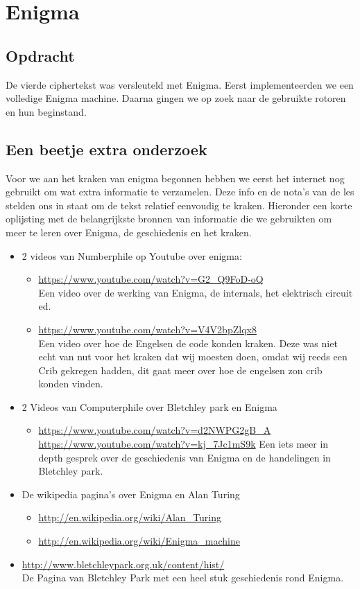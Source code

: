 
\section{Enigma}
\subsection{Opdracht}
De vierde ciphertekst was versleuteld met Enigma. Eerst implementeerden we een volledige Enigma machine. Daarna gingen we op zoek naar de gebruikte rotoren en hun beginstand. 

\subsection{Een beetje extra onderzoek}
Voor we aan het kraken van enigma begonnen hebben we eerst het internet nog gebruikt om wat extra informatie te verzamelen. Deze info en de nota's van de les stelden ons in staat om de tekst relatief eenvoudig te kraken.
Hieronder een korte oplijsting met de belangrijkste bronnen van informatie die we gebruikten om meer te leren over Enigma, de geschiedenis en het kraken.

\begin{itemize}
\item 2 videos van Numberphile op Youtube over enigma:
	\begin{itemize}
	\item \url{https://www.youtube.com/watch?v=G2_Q9FoD-oQ} \\
		Een video over de werking van Enigma, de internals, het elektrisch circuit ed.
	\item \url{https://www.youtube.com/watch?v=V4V2bpZlqx8} \\
		Een video over hoe de Engelsen de code konden kraken. Deze was niet echt van nut voor het kraken dat wij moesten doen, omdat wij reeds een Crib gekregen hadden, dit gaat meer over hoe de engelsen zon crib konden vinden.
	\end{itemize}
\item 2 Videos van Computerphile over Bletchley park en Enigma
	\begin{itemize}
	\item \url{https://www.youtube.com/watch?v=d2NWPG2gB_A}
	\url{https://www.youtube.com/watch?v=kj_7Jc1mS9k}
	Een iets meer in depth gesprek over de geschiedenis van Enigma en de handelingen in Bletchley park.
	\end{itemize}
\item De wikipedia pagina's over Enigma en Alan Turing
	\begin{itemize}
		\item \url{http://en.wikipedia.org/wiki/Alan_Turing}
		\item \url{http://en.wikipedia.org/wiki/Enigma_machine}
	\end{itemize}
	\item \url{http://www.bletchleypark.org.uk/content/hist/} \\ De Pagina van Bletchley Park met een heel stuk geschiedenis rond Enigma.
\end{itemize}


